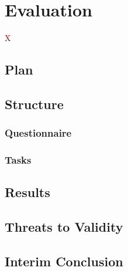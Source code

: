 \documentclass[../thesis]{subfiles}
\begin{document}
\chapter{Evaluation}\label{ch:evaluation}

\lettrine[lines=3]{\textcolor{Maroon}{X}}{} \fxfatal{}

\section{Plan}
\fxfatal{}

\section{Structure}
\fxfatal{}

\subsection{Questionnaire}
\fxfatal{}

\subsection{Tasks}
\fxfatal{}

\section{Results}
\fxfatal{}

\section{Threats to Validity}
\fxfatal{}

\section{Interim Conclusion}  %
\fxfatal{}
\end{document}

